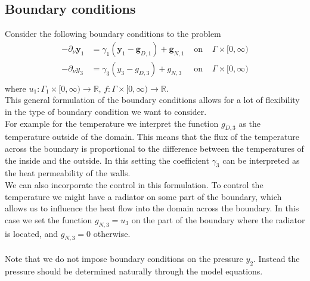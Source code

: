 \documentclass[
12pt,
a4paper,
onecolumn,
portrait
]{article}
\begin{document}
\subsection{Boundary conditions}
Consider the following boundary conditions to the problem
\begin{align}
- \partial_{\nu} \mathbf{y}_1 &= \gamma_1(\mathbf{y}_1 - \mathbf{g}_{D,1}) + \mathbf{g}_{N,1} &\text{ on } &\Gamma \times [0, \infty) \label{eq:pde-boundary-air-velocity-dirichlet} \\
- \partial_{\nu} y_3 &= \gamma_3 (y_3 - g_{D,3}) + g_{N,3} &\text{ on } &\Gamma \times [0, \infty) \label{eq:pde-boundary-heating}\\
\end{align}
where $u_1: \Gamma_1 \times [0, \infty) \rightarrow \mathbb{R}$, $f: \Gamma \times [0, \infty) \rightarrow \mathbb{R}$. \\
This general formulation of the boundary conditions allows for a lot of flexibility in the type of boundary condition we want to consider. \\
For example for the temperature we interpret the function $g_{D,3}$ as the temperature outside of the domain. This means that the flux of the temperature across the boundary is proportional to the difference between the temperatures of the inside and the outside. In this setting the coefficient $\gamma_3$ can be interpreted as the heat permeability of the walls. \\
We can also incorporate the control in this formulation. To control the temperature we might have a radiator on some part of the boundary, which allows us to influence the heat flow into the domain across the boundary. In this case we set the function $g_{N, 3} = u_{3}$ on the part of the boundary where the radiator is located, and $g_{N, 3} = 0$ otherwise.\\
\\
Note that we do not impose boundary conditions on the pressure $y_2$. Instead the pressure should be determined naturally through the model equations.
\end{document}
